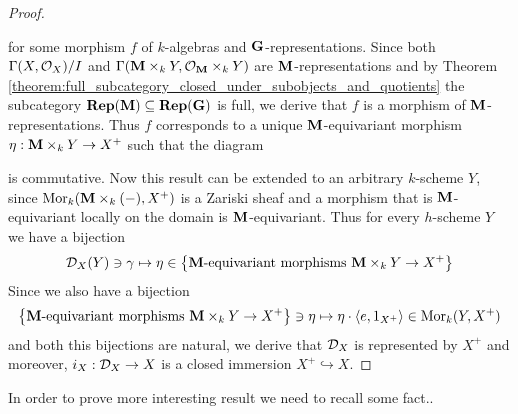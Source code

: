 \begin{proof}
\begin{center}
\end{center}
for some morphism $f$ of $k$-algebras and $\mathbf{G}$-representations. Since both $\Gamma(X,{\mathcal O}_X)/I$ and $\Gamma(\mathbf{M}\times_kY,{\mathcal O}_{\mathbf{M}}\times_kY)$ are $\mathbf{M}$-representations and by Theorem \ref{theorem:full_subcategory_closed_under_subobjects_and_quotients} the subcategory $\mathbf{Rep}(\mathbf{M})\subseteq \mathbf{Rep}(\mathbf{G})$ is full, we derive that $f$ is a morphism of $\mathbf{M}$-representations. Thus $f$ corresponds to a unique $\mathbf{M}$-equivariant morphism $\eta:\mathbf{M}\times_kY\rightarrow X^+$ such that the diagram
\begin{center}
\end{center}
is commutative. Now this result can be extended to an arbitrary $k$-scheme $Y$, since $\mathrm{Mor}_k(\mathbf{M}\times_k(-),X^+)$ is a Zariski sheaf and a morphism that is $\mathbf{M}$-equivariant locally on the domain is $\mathbf{M}$-equivariant. Thus for every $h$-scheme $Y$ we have a bijection
$${\mathcal D}_X(Y)\ni \gamma \mapsto \eta \in \big\{\mathbf{M}\mbox{-equivariant morphisms }\mathbf{M}\times_kY\rightarrow X^+\big\}$$
Since we also have a bijection
$$\big\{\mathbf{M}\mbox{-equivariant morphisms }\mathbf{M}\times_kY\rightarrow X^+\big\}\ni \eta \mapsto \eta\cdot \langle e, 1_{X^+}\rangle \in \mathrm{Mor}_k(Y,X^+)$$
and both this bijections are natural, we derive that ${\mathcal D}_X$ is represented by $X^+$ and moreover, $i_X:{\mathcal D}_X\rightarrow X$ is a closed immersion $X^+\hookrightarrow X$.
\end{proof}
\noindent
In order to prove more interesting result we need to recall some fact..


